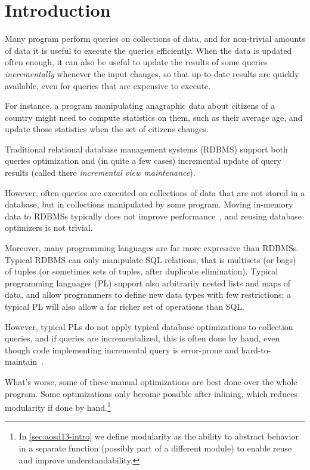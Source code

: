 \chapter{Introduction}

Many program perform queries on collections of data, and for non-trivial amounts
of data it is useful to execute the queries efficiently. When the data is
updated often enough, it can also be useful to update the results of some
queries \emph{incrementally} whenever the input changes, so that up-to-date
results are quickly available, even for queries that are expensive to execute.

For instance, a program manipulating anagraphic data about citizens of a country
might need to compute statistics on them, such as their average age, and update
those statistics when the set of citizens changes.

Traditional relational database management systems (RDBMS) support both queries
optimization and (in quite a few cases) incremental update of query results
(called there \emph{incremental view maintenance}).

However, often queries are executed on collections of data that are not stored
in a database, but in collections manipulated by some program. Moving in-memory
data to RDBMSs typically does not improve
performance~\citep{Stonebraker07,Rompf2015functional}, and reusing database
optimizers is not trivial.

Moreover, many programming languages are far more expressive than RDBMSs.
Typical RDBMS can only manipulate SQL relations, that is multisets (or bags) of
tuples (or sometimes sets of tuples, after duplicate elimination). Typical
programming languages (PL) support also arbitrarily nested lists and maps of
data, and allow programmers to define new data types with few restrictions; a
typical PL will also allow a far richer set of operations than SQL\@.

However, typical PLs do not apply typical database optimizations to collection
queries, and if queries are incrementalized, this is often done by hand, even
though code implementing incremental query is error-prone and
hard-to-maintain~\citep{Salvaneschi13reactive}.

What's worse, some of these manual optimizations are best done over the whole
program. Some optimizations only become possible after inlining, which reduces
modularity if done by hand.\footnote{%
In \cref{sec:aosd13-intro} we define modularity as the ability to abstract
behavior in a separate function (possibly part of a different module) to enable
reuse and improve understandability.%
}

